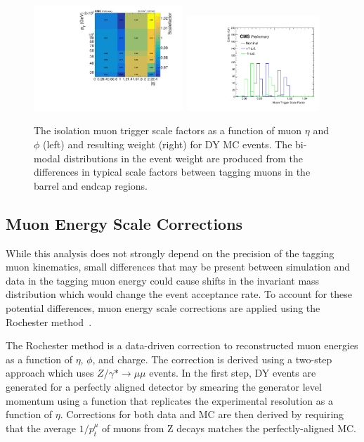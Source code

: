 \begin{figure}[htbp]
	\centering
	\includegraphics[width=0.5\textwidth]{figures/muTrigEff_2018.pdf}
        \hspace{0.01\textwidth}
        \includegraphics[width=0.45\textwidth]{figures/trigSF.pdf}
	\caption[Muon Trigger Scale Factors and Weights]{The isolation muon trigger scale factors as a function of muon $\eta$ and $\phi$ (left) and resulting weight (right) for DY MC events. The bi-modal distributions in the event weight are produced from the differences in typical scale factors between tagging muons in the barrel and endcap regions.}
        \label{fig:muTrigSFs}
\end{figure}

\subsection{Muon Energy Scale Corrections}
While this analysis does not strongly depend on the precision of the tagging muon kinematics, small differences that may be present between simulation and data in the tagging muon energy could cause shifts in the invariant mass distribution which would change the event acceptance rate.
To account for these potential differences, muon energy scale corrections are applied using the Rochester method~\cite{rochester_corr}.

The Rochester method is a data-driven correction to reconstructed muon energies as a function of $\eta$, $\phi$, and charge.
The correction is derived using a two-step approach which uses $Z/\gamma* \rightarrow \mu\mu$ events.
In the first step, DY events are generated for a perfectly aligned detector by smearing the generator level momentum using a function that replicates the experimental resolution as a function of $\eta$. 
Corrections for both data and MC are then derived by requiring that the average $1/p_t^\mu$ of muons from Z decays matches the perfectly-aligned MC.

